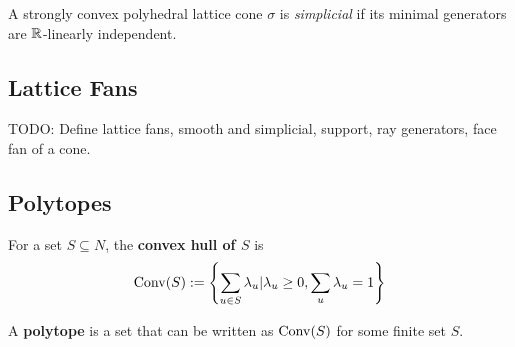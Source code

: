 \begin{definition}
  \label{3-simplicial-cone}
  A strongly convex polyhedral lattice cone $\sigma$ is
  \emph{simplicial} if its minimal generators are ${\mathbb R}$-linearly
  independent.
\end{definition}


\subsection{Lattice Fans}

TODO: Define lattice fans, smooth and simplicial, support, ray
generators, face fan of a cone.

\subsection{Polytopes}

\begin{definition}
  \label{3-convex-hull}
  \uses{}
  \leanok
  For a set $S \subseteq N$, the {\bf convex hull of $S$} is
  $$\operatorname{Conv}(S) := \left\{\sum_{u \in S} \lambda_u | \lambda_u \ge 0, \sum_u \lambda_u = 1\right\}$$
\end{definition}

\begin{definition}[Polytope]
  \label{3-polytope}
  \leanok
  A {\bf polytope} is a set that can be written as $\operatorname{Conv}(S)$ for
  some finite set $S$.
\end{definition}
